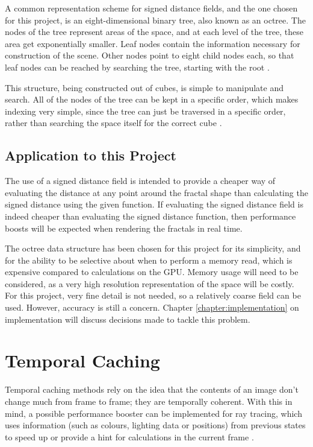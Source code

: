 A common representation scheme for signed distance fields, and the one chosen for this project, is an eight-dimensional binary tree, also known as an octree. The nodes of the tree represent areas of the space, and at each level of the tree, these area get exponentially smaller. Leaf nodes contain the information necessary for construction of the scene. Other nodes point to eight child nodes each, so that leaf nodes can be reached by searching the tree, starting with the root \cite{meagher1982geometric}.\newline

This structure, being constructed out of cubes, is simple to manipulate and search. All of the nodes of the tree can be kept in a specific order, which makes indexing very simple, since the tree can just be traversed in a specific order, rather than searching the space itself for the correct cube \cite{meagher1982geometric}.\newline

\subsection{Application to this Project}

The use of a signed distance field is intended to provide a cheaper way of evaluating the distance at any point around the fractal shape than calculating the signed distance using the given function. If evaluating the signed distance field is indeed cheaper than evaluating the signed distance function, then performance boosts will be expected when rendering the fractals in real time.\newline

The octree data structure has been chosen for this project for its simplicity, and for the ability to be selective about when to perform a memory read, which is expensive compared to calculations on the GPU. Memory usage will need to be considered, as a very high resolution representation of the space will be costly. For this project, very fine detail is not needed, so a relatively coarse field can be used. However, accuracy is still a concern. Chapter \ref{chapter:implementation} on implementation will discuss decisions made to tackle this problem.

\section{Temporal Caching} \label{section:temporal-caching}

Temporal caching methods rely on the idea that the contents of an image don't change much from frame to frame; they are temporally coherent. With this in mind, a possible performance booster can be implemented for ray tracing, which uses information (such as colours, lighting data or positions) from previous states to speed up or provide a hint for calculations in the current frame \cite{cosenza2008estimating}.\newline

